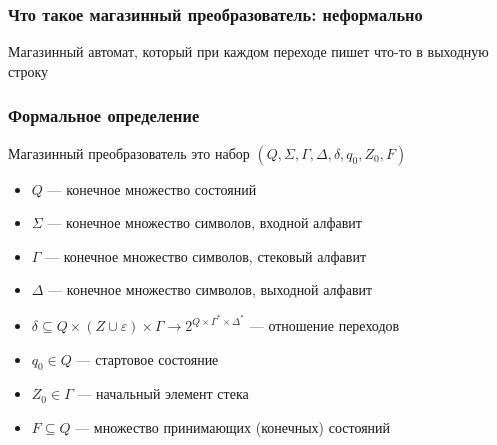 \documentclass{beamer}
\begin{document}
\begin{frame}[fragile]
  \transwipe[direction=90]
  \frametitle{Что такое магазинный преобразователь: неформально}
 \begin{center}
    Магазинный автомат, который при каждом переходе пишет что-то в выходную строку
 \end{center}
\end{frame}


\begin{frame}[fragile]
  \transwipe[direction=90]
  \frametitle{Формальное определение}

  \begin{center}
    Магазинный преобразователь это набор $(Q, \Sigma, \Gamma, \Delta, \delta, q_0, Z_0, F)$
  \end{center}
  \begin{itemize}
    \item $Q$ --- конечное множество состояний
    \item $\Sigma$ --- конечное множество символов, входной алфавит
    \item $\Gamma$ --- конечное множество символов, стековый алфавит
    \item $\Delta$ --- конечное множество символов, выходной алфавит
    \item $\delta \subseteq Q \times (Z \cup \varepsilon) \times \Gamma \rightarrow 2^{Q \times \Gamma^* \times \Delta^*}$ --- отношение переходов
    \item $q_0 \in Q$ --- стартовое состояние
    \item $Z_0 \in \Gamma$ --- начальный элемент стека
    \item $F \subseteq Q$ --- множество принимающих (конечных) состояний
  \end{itemize}
\end{frame}
\end{document}
